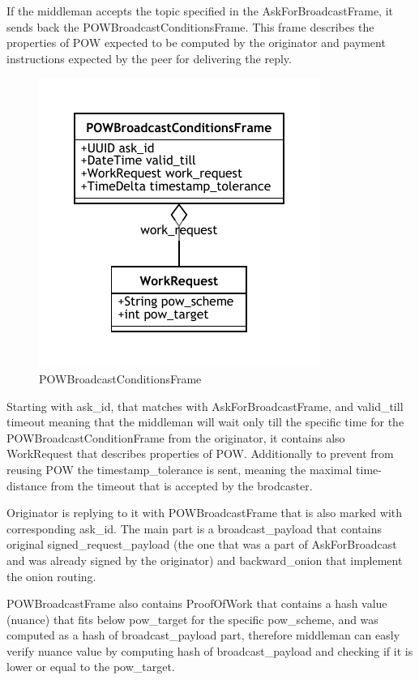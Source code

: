 \documentclass{article}
\begin{document}
If the middleman accepts the topic specified in the AskForBroadcastFrame, it sends back the POWBroadcastConditionsFrame. This frame describes the properties of POW expected to be computed by the originator and payment instructions expected by the peer for delivering the reply.

\begin{figure}
	\centering
	\includegraphics[scale=1.0]{POWBroadcastCondition.pdf}
	\caption{POWBroadcastConditionsFrame}
	\label{fig:fr:powbroadcastcondition}
\end{figure}

Starting with ask\_id, that matches with AskForBroadcastFrame, and valid\_till timeout meaning that the middleman will wait only till the specific time for the POWBroadcastConditionFrame from the originator, it contains also WorkRequest that describes properties of POW. Additionally to prevent from reusing POW the timestamp\_tolerance is sent, meaning the maximal time-distance from the timeout that is accepted by the brodcaster.

Originator is replying to it with POWBroadcastFrame that is also marked with corresponding ask\_id. The main part is a broadcast\_payload that contains original signed\_request\_payload (the one that was a part of AskForBroadcast and was already signed by the originator) and backward\_onion that implement the onion routing.

POWBroadcastFrame also contains ProofOfWork that contains a hash value (nuance) that fits below pow\_target for the specific pow\_scheme, and was computed as a hash of broadcast\_payload part, therefore middleman can easly verify nuance value by computing hash of broadcast\_payload and checking if it is lower or equal to the pow\_target. 
\end{document}
